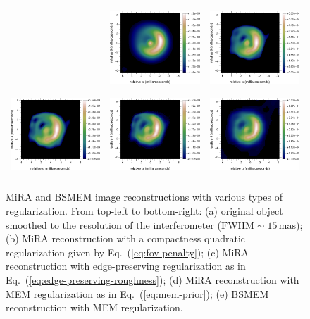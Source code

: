 \documentclass{article}
\newcommand{\Mira}{MiRA\xspace}
\newcommand{\BSMEM}{BSMEM\xspace}
\begin{document}
\begin{figure}[!t]
  \centering
  \begin{tabular}{lcr}
  &
  \includegraphics[height=30mm]{fig3a} &
  \includegraphics[height=30mm]{fig3b} \\[2mm]
  \includegraphics[height=30mm]{fig3c} &
  \includegraphics[height=30mm]{fig3d} &
  \includegraphics[height=30mm]{fig3e-alt}\\
  \end{tabular}
  \caption{\Mira and \BSMEM image reconstructions with various types of
    regularization.  From top-left to bottom-right: (a) original object
    smoothed to the resolution of the interferometer
    ($\mathrm{FWHM}\sim15\,\mathrm{mas}$); (b) \Mira reconstruction with a
    compactness quadratic regularization given by
    Eq.~(\protect\ref{eq:fov-penalty}); (c) \Mira reconstruction with
    edge-preserving regularization as in
    Eq.~(\protect\ref{eq:edge-preserving-roughness}); (d) \Mira reconstruction
    with MEM regularization as in Eq.~(\protect\ref{eq:mem-prior}); (e) \BSMEM
    reconstruction with MEM regularization.}
  \label{fig:regularization-types}
\end{figure}
\end{document}
